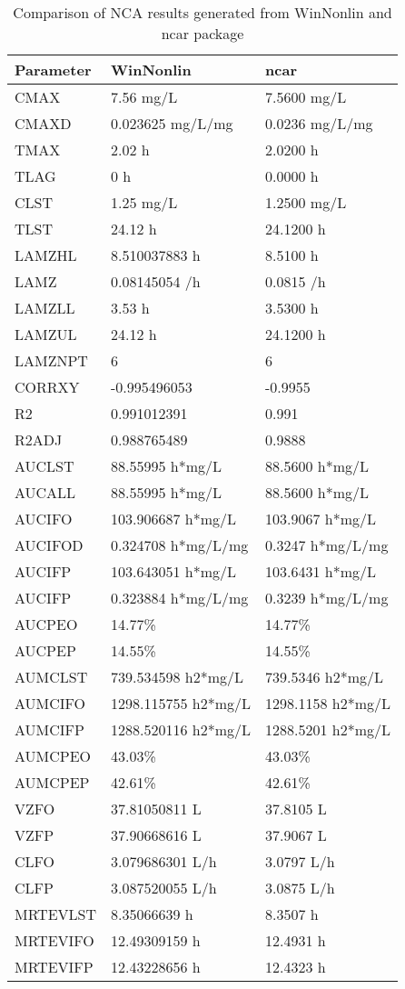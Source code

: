 \documentclass[12pt,]{krantz}
\theoremstyle{definition}
\theoremstyle{definition}
\theoremstyle{definition}
\theoremstyle{remark}
\begin{document}
\begin{table}

\caption{\label{tab:table3}Comparison of NCA results generated from WinNonlin and ncar package}
\centering
\begin{tabular}[t]{lll}
\toprule
Parameter & WinNonlin & ncar\\
\midrule
CMAX & 7.56 mg/L & 7.5600 mg/L\\
CMAXD & 0.023625 mg/L/mg & 0.0236 mg/L/mg\\
TMAX & 2.02 h & 2.0200 h\\
TLAG & 0 h & 0.0000 h\\
CLST & 1.25 mg/L & 1.2500 mg/L\\
\addlinespace
TLST & 24.12 h & 24.1200 h\\
LAMZHL & 8.510037883 h & 8.5100 h\\
LAMZ & 0.08145054 /h & 0.0815 /h\\
LAMZLL & 3.53 h & 3.5300 h\\
LAMZUL & 24.12 h & 24.1200 h\\
\addlinespace
LAMZNPT & 6 & 6\\
CORRXY & -0.995496053 & -0.9955\\
R2 & 0.991012391 & 0.991\\
R2ADJ & 0.988765489 & 0.9888\\
AUCLST & 88.55995 h*mg/L & 88.5600 h*mg/L\\
\addlinespace
AUCALL & 88.55995 h*mg/L & 88.5600 h*mg/L\\
AUCIFO & 103.906687 h*mg/L & 103.9067 h*mg/L\\
AUCIFOD & 0.324708 h*mg/L/mg & 0.3247 h*mg/L/mg\\
AUCIFP & 103.643051 h*mg/L & 103.6431 h*mg/L\\
AUCIFP & 0.323884 h*mg/L/mg & 0.3239 h*mg/L/mg\\
\addlinespace
AUCPEO & 14.77\% & 14.77\%\\
AUCPEP & 14.55\% & 14.55\%\\
AUMCLST & 739.534598 h2*mg/L & 739.5346 h2*mg/L\\
AUMCIFO & 1298.115755 h2*mg/L & 1298.1158 h2*mg/L\\
AUMCIFP & 1288.520116 h2*mg/L & 1288.5201 h2*mg/L\\
\addlinespace
AUMCPEO & 43.03\% & 43.03\%\\
AUMCPEP & 42.61\% & 42.61\%\\
VZFO & 37.81050811 L & 37.8105 L\\
VZFP & 37.90668616 L & 37.9067 L\\
CLFO & 3.079686301 L/h & 3.0797 L/h\\
\addlinespace
CLFP & 3.087520055 L/h & 3.0875 L/h\\
MRTEVLST & 8.35066639 h & 8.3507 h\\
MRTEVIFO & 12.49309159 h & 12.4931 h\\
MRTEVIFP & 12.43228656 h & 12.4323 h\\
\bottomrule
\end{tabular}
\end{table}
\end{document}
